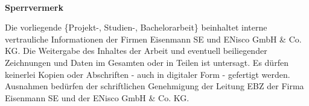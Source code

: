 
~

\vspace{17.1mm}

\begin{flushleft}
    \textbf{\huge{}Sperrvermerk}{\huge\par}
\par\end{flushleft}
Die vorliegende \{Projekt-, Studien-, Bachelorarbeit\} beinhaltet interne vertrauliche Informationen der Firmen Eisenmann SE und ENisco GmbH \& Co. KG. Die Weitergabe des Inhaltes der Arbeit und eventuell beiliegender Zeichnungen und Daten im Gesamten oder in Teilen ist untersagt. Es dürfen keinerlei Kopien oder Abschriften - auch in digitaler Form - gefertigt werden. Ausnahmen bedürfen der schriftlichen Genehmigung der Leitung EBZ der Firma Eisenmann SE und der ENisco GmbH \& Co. KG.